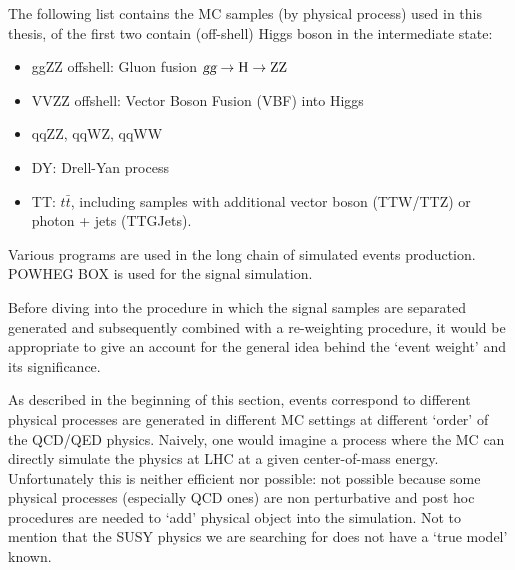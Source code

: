 


The following list contains the MC samples (by physical process) used in this thesis, of the first two
contain (off-shell) Higgs boson in the intermediate state:
\begin{itemize}
\item ggZZ offshell: Gluon fusion $\textsl{g}\textsl{g} \rightarrow\mathrm{H}\rightarrow\mathrm{ZZ}$
\item VVZZ offshell: Vector Boson Fusion (VBF) into Higgs
\item qqZZ, qqWZ, qqWW
\item DY: Drell-Yan process
\item TT: $t\bar{t}$, including samples with additional vector boson (TTW/TTZ) or photon + jets (TTGJets).
\end{itemize}

Various programs are used in the long chain of simulated events production.
\textsc{POWHEG BOX}\xspace\cite{POWHEG} is used for the signal simulation.

Before diving into the procedure in which the signal samples are separated generated and
subsequently combined with a re-weighting procedure, it would be appropriate to give
an account for the general idea behind the `event weight' and its significance.

As described in the beginning of this section, events correspond to different physical
processes are generated in different MC settings at different `order' of the QCD/QED physics.
Naively, one would imagine a process where the MC can directly simulate the physics at
LHC at a given center-of-mass energy. Unfortunately this is neither efficient nor possible:
not possible because some physical processes (especially QCD ones) are non perturbative and
post hoc procedures are needed to `add' physical object into the simulation. Not to mention
that the SUSY physics we are searching for does not have a `true model' known.

